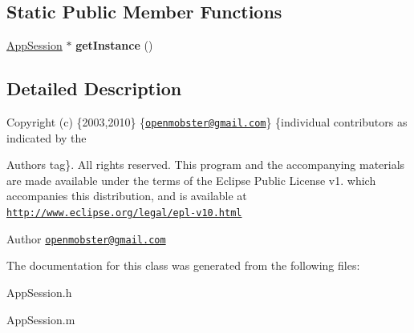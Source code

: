 \subsection*{\-Static \-Public \-Member \-Functions}
\begin{DoxyCompactItemize}
\item 
\hypertarget{interface_app_session_a31cc8654a98e161a6f1fd70f0ab29458}{
\hyperlink{interface_app_session}{\-App\-Session} $\ast$ {\bfseries get\-Instance} ()}
\label{interface_app_session_a31cc8654a98e161a6f1fd70f0ab29458}

\end{DoxyCompactItemize}


\subsection{\-Detailed \-Description}
\-Copyright (c) \{2003,2010\} \{\href{mailto:openmobster@gmail.com}{\tt openmobster@gmail.\-com}\} \{individual contributors as indicated by the \begin{DoxyAuthor}{\-Authors}
tag\}. \-All rights reserved. \-This program and the accompanying materials are made available under the terms of the \-Eclipse \-Public \-License v1. which accompanies this distribution, and is available at \href{http://www.eclipse.org/legal/epl-v10.html}{\tt http\-://www.\-eclipse.\-org/legal/epl-\/v10.\-html}
\end{DoxyAuthor}
\begin{DoxyAuthor}{\-Author}
\href{mailto:openmobster@gmail.com}{\tt openmobster@gmail.\-com} 
\end{DoxyAuthor}


\-The documentation for this class was generated from the following files\-:\begin{DoxyCompactItemize}
\item 
\-App\-Session.\-h\item 
\-App\-Session.\-m\end{DoxyCompactItemize}
